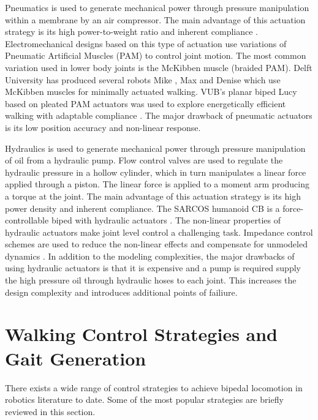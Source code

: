 Pneumatics is used to generate mechanical power through pressure manipulation within a membrane by an air compressor. The main advantage of this actuation strategy is its high power-to-weight ratio and inherent compliance \cite{Wisse2007}. Electromechanical designs based on this type of actuation use variations of Pneumatic Artificial Muscles (PAM) to control joint motion. The most common variation used in lower body joints is the McKibben muscle (braided PAM). Delft University has produced several robots Mike \cite{Wisse2003}, Max \cite{Hobbelen2005} and Denise \cite{Hobbelen2008,Wisse:2007wh} which use McKibben muscles for minimally actuated walking. VUB's planar biped Lucy based on pleated PAM actuators was used to explore energetically efficient walking with adaptable compliance \cite{Vanderborght:2005kq}. The major drawback of pneumatic actuators is its low position accuracy and non-linear response. 

Hydraulics is used to generate mechanical power through pressure manipulation of oil from a hydraulic pump. Flow control valves are used to regulate the hydraulic pressure in a hollow cylinder, which in turn manipulates a linear force applied through a piston. The linear force is applied to a moment arm producing a torque at the joint. The main advantage of this actuation strategy is its high power density and inherent compliance. The SARCOS humanoid CB is a force-controllable biped with hydraulic actuators \cite{SangHoHyon:2007jy}. The non-linear properties of hydraulic actuators make joint level control a challenging task. Impedance control schemes are used to reduce the non-linear effects and compensate for unmodeled dynamics \cite{Bilodeau1998}. In addition to the modeling complexities, the major drawbacks of using hydraulic actuators is that it is expensive and a pump is required supply the high pressure oil through hydraulic hoses to each joint. This increases the design complexity and introduces additional points of failiure. 








\section{Walking Control Strategies and Gait Generation} %
\label{sec:related_control_strategies}
There exists a wide range of control strategies to achieve bipedal locomotion in robotics literature to date. Some of the most popular strategies are briefly reviewed in this section.


